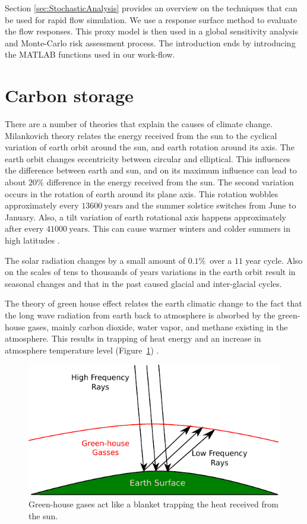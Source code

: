 Section \ref{sec:StochasticAnalysis} provides an overview on the techniques that can be used for rapid flow simulation. We use a response surface
method to evaluate the flow responses. This proxy model is then used in a global sensitivity analysis and Monte-Carlo risk assessment process. The introduction ends by introducing the MATLAB functions used in our work-flow. 

\section{Carbon storage}
\label{sec:CarbonStorage}
There are a number of theories that explain the causes of climate change.
Milankovich theory \cite{foukal2006variations} relates the energy received from
the sun to the  cyclical variation of earth orbit around the sun, and earth
rotation around its axis. The earth orbit changes eccentricity between circular
and elliptical. This influences the difference between earth and sun, and on its
maximum influence can lead to about $20\%$ difference in the energy received
from the sun. The second variation occurs in the rotation of earth around its
plane axis. This rotation wobbles approximately every $13600~\mbox{years}$ and
the summer solstice switches from June to January. Also, a tilt variation of
earth rotational axis happens approximately after every $41000~\mbox{years}$.
This can cause warmer winters and colder summers in high latitudes
\cite{foukal2006variations}. 

The solar radiation changes by a small amount of $0.1\%$~over a $11$ year cycle.
Also on the scales of tens to thousands of years variations in the earth orbit
result in seasonal changes and that in the past caused glacial and inter-glacial
cycles.

The theory of green house effect relates the earth climatic change to the fact
that the long wave radiation from earth back to atmosphere is absorbed by the
green-house gases, mainly carbon dioxide, water vapor, and methane existing in
the atmosphere. This results in trapping of heat energy and an increase in
atmosphere temperature level (Figure~\ref{fig:grHsGs})
\cite{foukal2006variations}.

\begin{figure}
  \centering
  \includegraphics[width=0.65 \linewidth]{./figurer/G-H_gasses} 
  \caption{Green-house gases act like a blanket trapping the heat received from
the sun.}
  \label{fig:grHsGs}
%
\end{figure}


